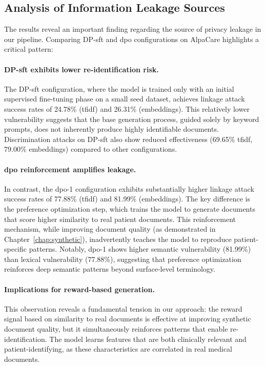 \subsection{Analysis of Information Leakage Sources}

The results reveal an important finding regarding the source of privacy leakage in our pipeline. Comparing DP-\gls{sft} and \gls{dpo} configurations on AlpaCare highlights a critical pattern:

\paragraph{DP-\gls{sft} exhibits lower re-identification risk.} The DP-\gls{sft} configuration, where the model is trained only with an initial supervised fine-tuning phase on a small seed dataset, achieves linkage attack success rates of 24.78\% (\gls{tfidf}) and 26.31\% (embeddings). This relatively lower vulnerability suggests that the base generation process, guided solely by keyword prompts, does not inherently produce highly identifiable documents. Discrimination attacks on DP-\gls{sft} also show reduced effectiveness (69.65\% \gls{tfidf}, 79.00\% embeddings) compared to other configurations.

\paragraph{\gls{dpo} reinforcement amplifies leakage.} In contrast, the \gls{dpo}-1 configuration exhibits substantially higher linkage attack success rates of 77.88\% (\gls{tfidf}) and 81.99\% (embeddings). The key difference is the preference optimization step, which trains the model to generate documents that score higher similarity to real patient documents. This reinforcement mechanism, while improving document quality (as demonstrated in Chapter~\ref{chap:synthetic}), inadvertently teaches the model to reproduce patient-specific patterns. Notably, \gls{dpo}-1 shows higher semantic vulnerability (81.99\%) than lexical vulnerability (77.88\%), suggesting that preference optimization reinforces deep semantic patterns beyond surface-level terminology.

\paragraph{Implications for reward-based generation.} This observation reveals a fundamental tension in our approach: the reward signal based on similarity to real documents is effective at improving synthetic document quality, but it simultaneously reinforces patterns that enable re-identification. The model learns features that are both clinically relevant and patient-identifying, as these characteristics are correlated in real medical documents.

